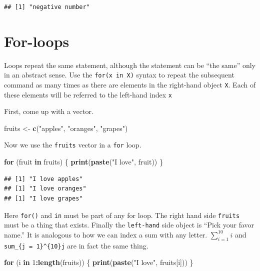 \documentclass[
]{book}
\newenvironment{Shaded}{\begin{snugshade}}{\end{snugshade}}
\newcommand{\ControlFlowTok}[1]{\textcolor[rgb]{0.13,0.29,0.53}{\textbf{#1}}}
\newcommand{\DecValTok}[1]{\textcolor[rgb]{0.00,0.00,0.81}{#1}}
\newcommand{\KeywordTok}[1]{\textcolor[rgb]{0.13,0.29,0.53}{\textbf{#1}}}
\newcommand{\NormalTok}[1]{#1}
\newcommand{\OperatorTok}[1]{\textcolor[rgb]{0.81,0.36,0.00}{\textbf{#1}}}
\newcommand{\StringTok}[1]{\textcolor[rgb]{0.31,0.60,0.02}{#1}}
\theoremstyle{definition}
\theoremstyle{definition}
\theoremstyle{definition}
\theoremstyle{remark}
\begin{document}
\begin{verbatim}
## [1] "negative number"
\end{verbatim}

\hypertarget{for-loops}{%
\section{For-loops}\label{for-loops}}

Loops repeat the same statement, although the statement can be ``the same'' only in an abstract sense. Use the \texttt{for(x\ in\ X)} syntax to repeat the subsequent command as many times as there are elements in the right-hand object \texttt{X}. Each of these elements will be referred to the left-hand index \texttt{x}

First, come up with a vector.

\begin{Shaded}
\begin{Highlighting}[]
\NormalTok{fruits <{-}}\StringTok{ }\KeywordTok{c}\NormalTok{(}\StringTok{"apples"}\NormalTok{, }\StringTok{"oranges"}\NormalTok{, }\StringTok{"grapes"}\NormalTok{)}
\end{Highlighting}
\end{Shaded}

Now we use the \texttt{fruits} vector in a \texttt{for} loop.

\begin{Shaded}
\begin{Highlighting}[]
\ControlFlowTok{for}\NormalTok{ (fruit }\ControlFlowTok{in}\NormalTok{ fruits) \{}
  \KeywordTok{print}\NormalTok{(}\KeywordTok{paste}\NormalTok{(}\StringTok{"I love"}\NormalTok{, fruit))}
\NormalTok{\}}
\end{Highlighting}
\end{Shaded}

\begin{verbatim}
## [1] "I love apples"
## [1] "I love oranges"
## [1] "I love grapes"
\end{verbatim}

Here \texttt{for()} and \texttt{in} must be part of any for loop. The right hand side \texttt{fruits} must be a thing that exists. Finally the \texttt{left-hand} side object is ``Pick your favor name.'' It is analogous to how we can index a sum with any letter. \(\sum_{i=1}^{10}i\) and \texttt{sum\_\{j\ =\ 1\}\^{}\{10\}j} are in fact the same thing.

\begin{Shaded}
\begin{Highlighting}[]
\ControlFlowTok{for}\NormalTok{ (i }\ControlFlowTok{in} \DecValTok{1}\OperatorTok{:}\KeywordTok{length}\NormalTok{(fruits)) \{}
  \KeywordTok{print}\NormalTok{(}\KeywordTok{paste}\NormalTok{(}\StringTok{"I love"}\NormalTok{, fruits[i]))}
\NormalTok{\}}
\end{Highlighting}
\end{Shaded}
\end{document}
